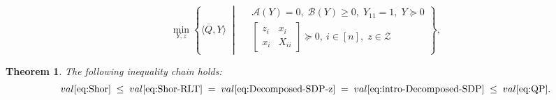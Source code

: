 \documentclass[10pt,a4paper]{amsart}
\newtheorem{theorem}{Theorem}
\def\A{\mathcal{A}}
\def\B{\mathcal{B}}
\def\bQ{\overline{Q}}
\begin{document}
\begin{equation}
\label{eq:Decomposed-SDP-z}
\min_{Y,z}\left\{
\langle \bQ,Y \rangle  \;\middle|\;  
\begin{aligned}
&\A(Y)=0,\; \B(Y)\geq 0,\;Y_{11}=1,\; Y\succeq 0\\
& \begin{bmatrix}
z_i & x_i\\
x_i & X_{ii}
\end{bmatrix}\succeq 0,\ i\in [n],\;z\in \mathcal{Z}
\end{aligned}
\right\},
\end{equation}

\begin{theorem}
\label{thm:equivalence} 
The following inequality chain holds:
\[
\emph{val} \eqref{eq:Shor}
\;\le\;
\emph{val} \eqref{eq:Shor-RLT}
\;=\;
\emph{val} \eqref{eq:Decomposed-SDP-z}
\;=\;
\emph{val} \eqref{eq:intro-Decomposed-SDP}
\;\le\; \emph{val} \eqref{eq:QP}.
\]
\end{theorem}
\end{document}
